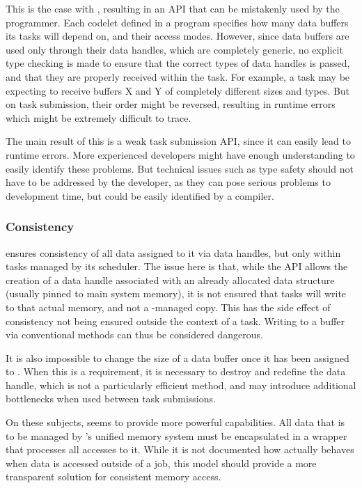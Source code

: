 \documentclass[main.tex]{subfiles}
\begin{document}
This is the case with \starpu, resulting in an API that can be mistakenly used by the programmer. Each codelet defined in a program specifies how many data buffers its tasks will depend on, and their access modes. However, since data buffers are used only through their data handles, which are completely generic, no explicit type checking is made to ensure that the correct types of data handles is passed, and that they are properly received within the task. For example, a task may be expecting to receive buffers X and Y of completely different sizes and types. But on task submission, their order might be reversed, resulting in runtime errors which might be extremely difficult to trace.

The main result of this is a weak task submission API, since it can easily lead to runtime errors. More experienced developers might have enough understanding to easily identify these problems. But technical issues such as type safety should not have to be addressed by the developer, as they can pose serious problems to development time, but could be easily identified by a compiler.

\subsubsection{Consistency} \label{sec:comparison:consistency}

\starpu ensures consistency of all data assigned to it via data handles, but only within tasks managed by its scheduler. The issue here is that, while the API allows the creation of a data handle associated with an already allocated data structure (usually pinned to main system memory), it is not ensured that tasks will write to that actual memory, and not a \starpu-managed copy. This has the side effect of consistency not being ensured outside the context of a task. Writing to a buffer via conventional methods can thus be considered dangerous.

It is also impossible to change the size of a data buffer once it has been assigned to \starpu. When this is a requirement, it is necessary to destroy and redefine the data handle, which is not a particularly efficient method, and may introduce additional bottlenecks when used between task submissions.

On these subjects, \gama seems to provide more powerful capabilities. All data that is to be managed by \gama's unified memory system must be encapsulated in a wrapper that processes all accesses to it. While it is not documented how \gama actually behaves when data is accessed outside of a job, this model should provide a more transparent solution for consistent memory access.
\end{document}
